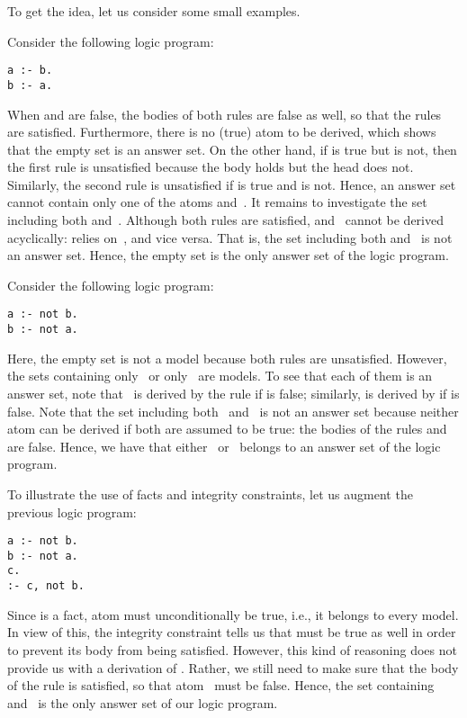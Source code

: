 To get the idea, let us consider some small examples.
%
\begin{example}\label{ex:as:one}
Consider the following logic program:
%
\begin{lstlisting}[numbers=none]
a :- b.
b :- a.
\end{lstlisting}
%
When  and  are false, the bodies of both rules are false as well,
so that the rules are satisfied.
Furthermore, there is no (true) atom to be derived,
which shows that the empty set is an answer set.
On the other hand, 
if  is true but  is not,
then the first rule is unsatisfied because the body holds but the head does not.
Similarly, the second rule is unsatisfied if  is true and  is not.
Hence, an answer set cannot contain only one of the atoms  and~.
It remains to investigate the set including both  and~.
Although both rules are satisfied,
 and~ cannot be derived acyclically:
 relies on~, and vice versa.
That is, the set including both  and~ is not an answer set.
Hence, the empty set is the only answer set of the logic program.
\eexample
\end{example}

Consider the following logic program:
%
\begin{lstlisting}[numbers=none]
a :- not b.
b :- not a.
\end{lstlisting}
%
Here, the empty set is not a model because both rules are unsatisfied.
However, the sets containing only~ or only~ are models.
To see that each of them is an answer set,
note that~ is derived by the rule 
if  is false;
similarly,
 is derived by 
if  is false.
Note that the set including both~ and~ is not an answer set
because neither atom can be derived if both are assumed to be true:
the bodies of the rules
 and
 are false.
Hence, we have that
either~ or~ belongs to
an answer set of the logic program.

To illustrate the use of facts and integrity constraints,
let us augment the previous logic program:
\begin{lstlisting}[numbers=none]
a :- not b.
b :- not a.
c.
:- c, not b.
\end{lstlisting}
Since  is a fact,
atom  must unconditionally be true, i.e.,
it belongs to every model.
In view of this,
the integrity constraint
tells us that  must be true as well
in order to prevent its body from being satisfied.
However, this kind of reasoning does not provide us with
a derivation of .
Rather, we still need to make sure that the body
of the rule  is satisfied,
so that atom~ must be false.
Hence, the set containing  and~
is the only answer set of our logic program.

